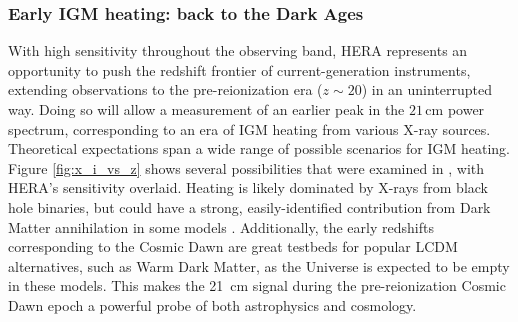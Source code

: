 \documentclass[preprint]{aastex}
\begin{document}

\subsubsection{Early IGM heating: back to the Dark Ages}

With high sensitivity throughout the observing band, HERA represents an opportunity to push the redshift 
frontier of current-generation instruments, extending observations to the pre-reionization era ($z \sim 20$)
in an  uninterrupted way.  Doing so will allow a measurement of an earlier peak in the $21\,\textrm{cm}$ power 
spectrum, corresponding to an era of IGM heating from various X-ray sources.  Theoretical expectations 
span a wide range of possible scenarios for IGM heating. Figure \ref{fig:x_i_vs_z} shows several possibilities that 
were examined in \cite{mesinger_et_al2013}, with HERA's sensitivity overlaid.  
Heating is likely dominated by X-rays from black
hole binaries, but could have a strong, easily-identified contribution from
Dark Matter annihilation in some models \citep{mesinger_et_al2013}.  Additionally, the early redshifts
corresponding to the Cosmic Dawn are great testbeds for popular LCDM
alternatives, such as Warm Dark Matter, as the Universe is expected to be empty
in these models.  This makes the 21~cm signal during the pre-reionization Cosmic
Dawn epoch a powerful probe of both astrophysics and cosmology. 
\end{document}
